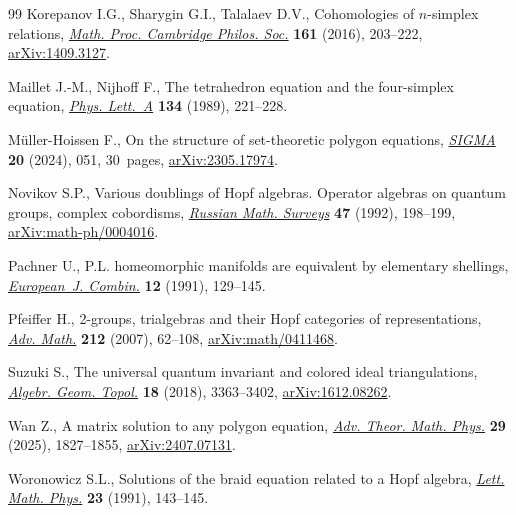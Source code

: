 \documentclass[10pt,a4paper]{amsart}
\numberwithin{equation}{section}
\theoremstyle{definition}
\begin{document}
\begin{thebibliography}{99}
Korepanov I.G., Sharygin G.I., Talalaev D.V., Cohomologies of {$n$}-simplex
 relations, \href{https://doi.org/10.1017/S030500411600030X}{\textit{Math.
 Proc. Cambridge Philos. Soc.}} \textbf{161} (2016), 203--222,
 \href{https://arxiv.org/abs/1409.3127}{arXiv:1409.3127}.

Maillet J.-M., Nijhoff F., The tetrahedron equation and the four-simplex
 equation, \href{https://doi.org/10.1016/0375-9601(89)90400-3}{\textit{Phys.
 Lett.~A}} \textbf{134} (1989), 221--228.

M\"{u}ller-Hoissen F., On the structure of set-theoretic polygon equations,
 \href{https://doi.org/10.3842/SIGMA.2024.051}{\textit{SIGMA}} \textbf{20}
 (2024), 051, 30~pages,
 \href{https://arxiv.org/abs/2305.17974}{arXiv:2305.17974}.

Novikov S.P., Various doublings of {H}opf algebras. {O}perator algebras on
 quantum groups, complex cobordisms,
 \href{https://doi.org/10.1070/RM1992v047n05ABEH000957}{\textit{Russian Math.
 Surveys}} \textbf{47} (1992), 198--199,
 \href{https://arxiv.org/abs/math-ph/0004016}{arXiv:math-ph/0004016}.

Pachner U., P.{L}. homeomorphic manifolds are equivalent by elementary
 shellings,
 \href{https://doi.org/10.1016/S0195-6698(13)80080-7}{\textit{European~J.
 Combin.}} \textbf{12} (1991), 129--145.

Pfeiffer H., 2-groups, trialgebras and their {H}opf categories of
 representations,
 \href{https://doi.org/10.1016/j.aim.2006.09.014}{\textit{Adv. Math.}}
 \textbf{212} (2007), 62--108,
 \href{https://arxiv.org/abs/math/0411468}{arXiv:math/0411468}.

Suzuki S., The universal quantum invariant and colored ideal triangulations,
 \href{https://doi.org/10.2140/agt.2018.18.3363}{\textit{Algebr. Geom.
 Topol.}} \textbf{18} (2018), 3363--3402,
 \href{https://arxiv.org/abs/1612.08262}{arXiv:1612.08262}.

Wan Z., A matrix solution to any polygon equation,
 \href{https://doi.org/10.4310/atmp.251120034604}{\textit{Adv. Theor. Math.
 Phys.}} \textbf{29} (2025), 1827--1855,
 \href{https://arxiv.org/abs/2407.07131}{arXiv:2407.07131}.

Woronowicz S.L., Solutions of the braid equation related to a {H}opf algebra,
 \href{https://doi.org/10.1007/BF00703727}{\textit{Lett. Math. Phys.}}
 \textbf{23} (1991), 143--145.


\end{thebibliography}
\end{document}
